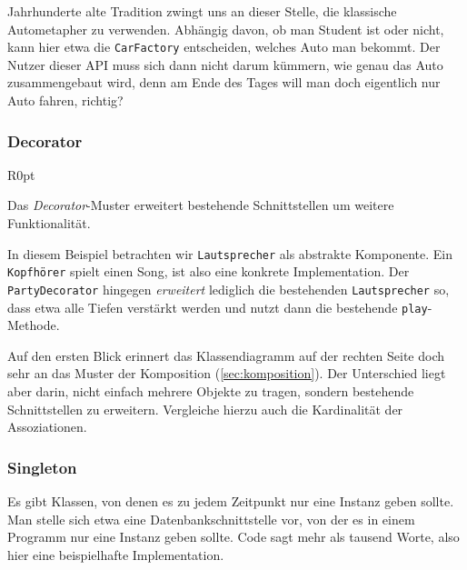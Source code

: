 \documentclass[a4paper,parskip=half*,DIV=7,fontsize=11pt]{scrartcl}
\begin{document}
Jahrhunderte alte Tradition zwingt uns an dieser Stelle, die klassische Autometapher zu verwenden. Abhängig davon, ob man Student ist oder nicht, kann hier etwa die \lstinline{CarFactory} entscheiden, welches Auto man bekommt. Der Nutzer dieser API muss sich dann nicht darum kümmern, wie genau das Auto zusammengebaut wird, denn am Ende des Tages will man doch eigentlich nur Auto fahren, richtig?

\subsubsection{Decorator}

\begin{wrapfigure}[11]{R}{0pt}
\end{wrapfigure}

Das \emph{Decorator}-Muster erweitert bestehende Schnittstellen um weitere Funktionalität.

In diesem Beispiel betrachten wir \lstinline{Lautsprecher} als abstrakte Komponente. Ein \lstinline{Kopfhörer} spielt einen Song, ist also eine konkrete Implementation. Der \lstinline{PartyDecorator} hingegen \emph{erweitert} lediglich die bestehenden \lstinline{Lautsprecher} so, dass etwa alle Tiefen verstärkt werden und nutzt dann die bestehende \lstinline{play}-Methode.

Auf den ersten Blick erinnert das Klassendiagramm auf der rechten Seite doch sehr an das Muster der Komposition (\ref{sec:komposition}). Der Unterschied liegt aber darin, nicht einfach mehrere Objekte zu tragen, sondern bestehende Schnittstellen zu erweitern. Vergleiche hierzu auch die Kardinalität der Assoziationen.

\subsubsection{Singleton}

Es gibt Klassen, von denen es zu jedem Zeitpunkt nur eine Instanz geben sollte. Man stelle sich etwa eine Datenbankschnittstelle vor, von der es in einem Programm nur eine Instanz geben sollte. Code sagt mehr als tausend Worte, also hier eine beispielhafte Implementation.
\end{document}
